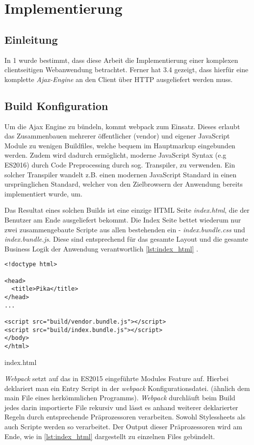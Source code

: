 \chapter{Implementierung}

\section{Einleitung}

In 1 wurde bestimmt, dass diese Arbeit die Implementierung einer komplexen clientseitigen Webanwendung betrachtet. Ferner hat 3.4 gezeigt, dass hierfür eine komplette \textit{Ajax-Engine} an den Client über HTTP ausgeliefert werden muss.

\section{Build Konfiguration}

Um die Ajax Engine zu bündeln, kommt \gls{webpack} zum Einsatz. Dieses erlaubt das Zusammenbauen mehrerer öffentlicher (vendor) und eigener JavaScript Module zu wenigen Buildfiles, welche bequem im Hauptmarkup eingebunden werden. Zudem wird dadurch ermöglicht, moderne JavaScript Syntax (e.g ES2016) durch Code Preprocessing durch sog. Transpiler, zu verwenden. Ein solcher Transpiler wandelt z.B. einen modernen JavaScript Standard in einen ursprünglichen Standard, welcher von den Zielbrowsern der Anwendung bereits implementiert wurde, um.

Das Resultat eines solchen Builds ist eine einzige HTML Seite \textit{index.html}, die der Benutzer am Ende ausgeliefert bekommt. Die Index Seite bettet wiederum nur zwei zusammengebaute Scripte aus allen bestehenden ein - \textit{index.bundle.css} und \textit{index.bundle.js}. Diese sind entsprechend für das gesamte Layout und die gesamte Business Logik der Anwendung verantwortlich \ref{lst:index_html} .

\begin{listing}[H]
\begin{verbatim}
<!doctype html>

<head>
  <title>Pika</title>
</head>
...

<script src="build/vendor.bundle.js"></script>
<script src="build/index.bundle.js"></script>
</body>
</html>

\end{verbatim}
\caption{index.html}
\label{lst:index_html}
\end{listing}

\textit{Webpack} setzt auf das in ES2015 eingeführte Modules Feature auf. Hierbei deklariert man ein Entry Script in der \textit{webpack} Konfigurationsdatei. (ähnlich dem main File eines herkömmlichen Programms). \textit{Webpack} durchläuft beim Build jedes darin importierte File rekursiv und lässt es anhand weiterer deklarierter Regeln durch entsprechende Präprozessoren verarbeiten. Sowohl Stylessheets als auch Scripte werden so verarbeitet. Der Output dieser Präprozessoren wird am Ende, wie in \ref{lst:index_html} dargestellt zu einzelnen Files gebündelt.

